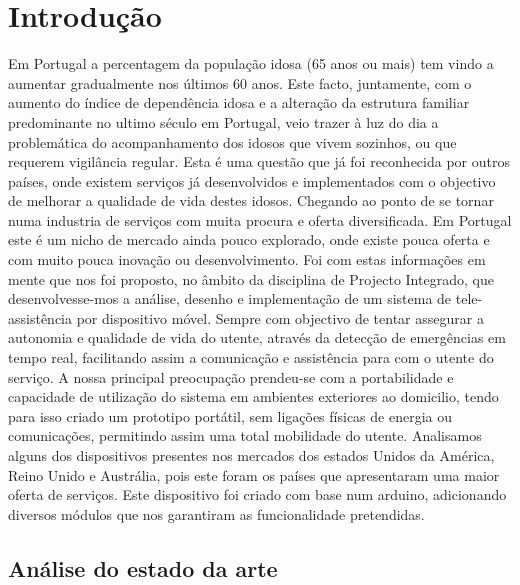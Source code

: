 \chapter{Introdução}
\label{intro}

Em Portugal a percentagem da população idosa (65 anos ou mais) tem vindo a aumentar gradualmente nos últimos 60 anos. Este facto, juntamente, com o aumento do índice de dependência idosa e a alteração da estrutura familiar predominante no ultimo século em Portugal, veio trazer à luz do dia a problemática do acompanhamento dos idosos que vivem sozinhos, ou que requerem vigilância regular.
Esta é uma questão que já foi reconhecida por outros países, onde existem serviços já desenvolvidos e implementados com o objectivo de melhorar a qualidade de vida destes idosos. Chegando ao ponto de se tornar numa industria de serviços com muita procura e oferta diversificada. Em Portugal este é um nicho de mercado ainda pouco explorado, onde existe pouca oferta e com muito pouca inovação ou desenvolvimento.
Foi com estas informações em mente que nos foi proposto, no âmbito da disciplina de Projecto Integrado, que desenvolvesse-mos a análise, desenho e implementação de um sistema de tele-assistência por dispositivo móvel. Sempre com objectivo de tentar assegurar a autonomia e qualidade de vida do utente, através da detecção de emergências em tempo real, facilitando assim a comunicação e assistência para  com o utente do serviço.
A nossa principal preocupação prendeu-se com a portabilidade e capacidade de utilização do sistema em ambientes exteriores ao domicilio, tendo para isso criado um prototipo portátil, sem ligações físicas de energia ou comunicações, permitindo assim uma total mobilidade do utente.
Analisamos alguns dos dispositivos presentes nos mercados dos estados Unidos da América, Reino Unido e Austrália, pois este foram os países que apresentaram uma maior oferta de serviços.
Este dispositivo foi criado com base num arduino, adicionando diversos módulos que nos garantiram as funcionalidade pretendidas.

\section{Análise do estado da arte}

